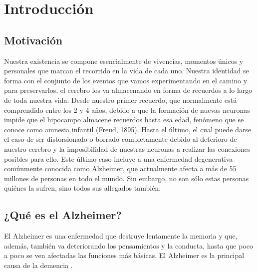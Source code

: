 \chapter{Introducción}
\label{cap:introduccion}


\section{Motivación}

Nuestra existencia se compone esencialmente de vivencias, momentos únicos y personales que marcan el recorrido en la vida de cada uno. Nuestra identidad se forma con el conjunto de los eventos que vamos experimentando en el camino y para preservarlos, el cerebro los va almacenando en forma de recuerdos a lo largo de toda nuestra vida.  Desde nuestro primer recuerdo, que normalmente está comprendido entre los 2 y 4 años, debido a que la formación de nuevas neuronas impide que el hipocampo almacene recuerdos hasta esa edad, fenómeno que se conoce como amnesia infantil (Freud, 1895). Hasta el último, el cual puede darse el caso de ser distorsionado o borrado completamente debido al deterioro de nuestro cerebro y la imposibilidad de nuestras neuronas a realizar las conexiones posibles para ello. Este último caso incluye a una enfermedad degenerativa comúnmente conocida como Alzheimer, que actualmente afecta a más de 55 millones de personas en todo el mundo. Sin embargo, no son sólo estas personas quiénes la sufren, sino todos sus allegados también. \\

\section{¿Qué es el Alzheimer?}

El Alzheimer es una enfermedad que destruye lentamente la memoria y que, además, también va deteriorando los pensamientos y la conducta, hasta que poco a poco se ven afectadas las funciones más básicas. El Alzheimer es la principal causa de la demencia \citep{NationalInstitute2023}.\\

